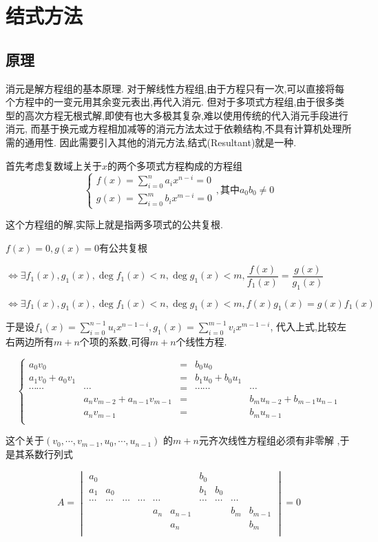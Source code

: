 \section{结式方法}
\subsection{原理}
	消元是解方程组的基本原理.
	对于解线性方程组,由于方程只有一次,可以直接将每个方程中的一变元用其余变元表出,再代入消元.
	但对于多项式方程组,由于很多类型的高次方程无根式解,即使有也大多极其复杂,难以使用传统的代入消元手段进行消元,
	而基于换元或方程相加减等的消元方法太过于依赖结构,不具有计算机处理所需的通用性.
	因此需要引入其他的消元方法,结式(Resultant)就是一种.

	首先考虑复数域上关于$ x$的两个多项式方程构成的方程组
	\[  \begin{cases} 
			f(x)=\sum_{i=0}^{n}{a_ix^{n-i}}=0 \\
			g(x)=\sum_{i=0}^{m}{b_ix^{m-i}}=0
	\end{cases} , \texttt{其中} a_0b_0\ne0\]

	这个方程组的解,实际上就是指两多项式的公共复根.

	$ f(x)=0,g(x)=0$有公共复根

	$ \Leftrightarrow \exists f_1(x), g_1(x), \deg f_1(x) < n, \deg g_1(x) < m, \dfrac{f(x)}{f_1(x)} = \dfrac{g(x)}{g_1(x)}$

	$ \Leftrightarrow \exists f_1(x),g_1(x),\deg f_1(x)<n,\deg g_1(x)<m,f(x)g_1(x)=g(x)f_1(x)$

	于是设$ f_1(x)=\sum_{i=0}^{n-1}{u_ix^{n-1-i}},g_1(x)=\sum_{i=0}^{m-1}{v_ix^{m-1-i}}$,
	代入上式,比较左右两边所有$ m+n$个项的系数,可得$ m+n$个线性方程.

	\[ \left \{  \begin{array}{lrclr}
	a_0v_0		&			&= &b_0u_0		&		\\
	a_1v_0+a_0v_1&			&= &b_1u_0+b_0u_1&		\\
	\cdots \cdots &\cdots	&= & \cdots\cdots &\cdots		\\
			&{a_nv_{m-2}+a_{n-1}v_{m-1}}&=&		&b_mu_{n-2}+b_{m-1}u_{n-1}\\
			& a_nv_{m-1}&= &				&b_mu_{n-1}\\
	\end{array}\right . \]

	这个关于$(v_0,\cdots,v_{m-1},u_0,\cdots,u_{n-1})$ 的$ m+n$元齐次线性方程组必须有非零解
	,于是其系数行列式
	
	\[ A=\begin{vmatrix} 
		a_0	&	&	&	&	 &		& b_0 &		&	 &	\\
		a_1	&a_0&	&	&			&	& b_1 & b_0	&	&	\\
  \cdots &\cdots &\cdots &\cdots	&  \cdots&	& \cdots &\cdots	&	\cdots	&	\\
		 &	&	&	&a_n &a_{n-1}   &		&	& b_m  & b_{m-1} \\
		 &	&	&	&	 &a_n		&		&	&	  & b_m\\
	\end{vmatrix} = 0\]


